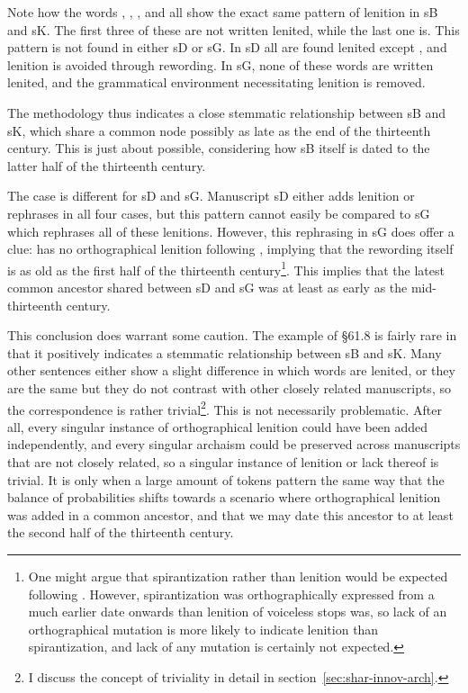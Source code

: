 Note how the words , , , and  all show the exact same pattern of lenition in \gls{sB} and \gls{sK}. The first three of these are not written lenited, while the last one is. This pattern is not found in either \gls{sD} or \gls{sG}. In \gls{sD} all are found lenited except , and lenition is avoided through rewording. In \gls{sG}, none of these words are written lenited, and the grammatical environment necessitating lenition is removed. 

The methodology thus indicates a close stemmatic relationship between \gls{sB} and \gls{sK}, which share a common node possibly as late as the end of the thirteenth century. This is just about possible, considering how \gls{sB} itself is dated to the latter half of the thirteenth century.

The case is different for \gls{sD} and \gls{sG}. Manuscript \gls{sD} either adds lenition or rephrases in all four cases, but this pattern cannot easily be compared to \gls{sG} which rephrases all of these lenitions. However, this rephrasing in \gls{sG} does offer a clue:  has no orthographical lenition following , implying that the rewording itself is as old as the first half of the thirteenth century\footnote{%
  One might argue that spirantization rather than lenition would be expected following . However, spirantization was orthographically expressed from a much earlier date onwards than lenition of voiceless stops was, so lack of an orthographical mutation is more likely to indicate lenition than spirantization, and lack of any mutation is certainly not expected.}.
This implies that the latest common ancestor shared between \gls{sD} and \gls{sG} was at least as early as the mid-thirteenth century.

This conclusion does warrant some caution. The example of \S 61.8 is fairly rare in that it positively indicates a stemmatic relationship between \gls{sB} and \gls{sK}. Many other sentences either show a slight difference in which words are lenited, or they are the same but they do not contrast with other closely related manuscripts, so the correspondence is rather trivial\footnote{I discuss the concept of triviality in detail in section~\ref{sec:shar-innov-arch}.}. This is not necessarily problematic. After all, every singular instance of orthographical lenition could have been added independently, and every singular archaism could be preserved across manuscripts that are not closely related, so a singular instance of lenition or lack thereof is trivial. It is only when a large amount of tokens pattern the same way that the balance of probabilities shifts towards a scenario where orthographical lenition was added in a common ancestor, and that we may date this ancestor to at least the second half of the thirteenth century.

